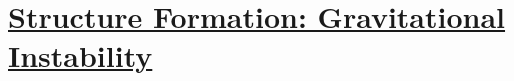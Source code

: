 \section[Structure Formation: Gravitational Instability]{\hyperlink{toc}{Structure Formation: Gravitational Instability}}

\subsection{}
\subsection{}
\subsection{}
\subsection{}
\subsection{}
\subsection{}
